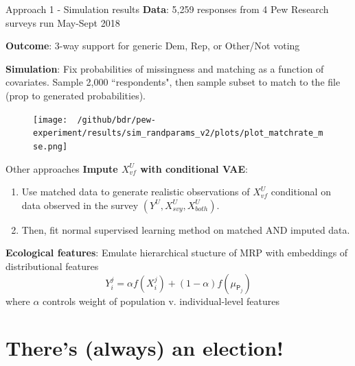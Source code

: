\documentclass[ignorenonframetext,]{beamer}
\begin{document}
\begin{frame}{Approach 1 - Simulation results}
\textbf{Data}: 5,259 responses from 4 Pew Research surveys run May-Sept 2018

\textbf{Outcome}: 3-way support for generic Dem, Rep, or Other/Not voting

\textbf{Simulation}: Fix probabilities of missingness and matching as a function of covariates.  Sample 2,000 ``respondents", then sample subset to match to the file (prop to generated probabilities). 

\begin{figure}
	\texttt{[image: ~/github/bdr/pew-experiment/results/sim\_randparams\_v2/plots/plot\_matchrate\_mse.png]}
\end{figure}
\end{frame}

\begin{frame}{Other approaches}
\pause
\textbf{Impute $X_{vf}^U$ with conditional VAE}:  
\begin{enumerate}
	\item Use matched data to generate realistic observations of $X_{vf}^U$ conditional on data observed in the survey $\left(Y^U, X_{svy}^U, X_{both}^U\right)$.  
	\item Then, fit normal supervised learning method on matched AND imputed data.
\end{enumerate}

\pause
\textbf{Ecological features}: Emulate hierarchical stucture of MRP with embeddings of distributional features
$$Y_i^j = \alpha f(X_i^j) + (1- \alpha)f(\mu_{\mathsf{P}_j})$$
where $\alpha$ controls weight of population v. individual-level features


\end{frame}

\section{There's (always) an election!}
\end{document}
